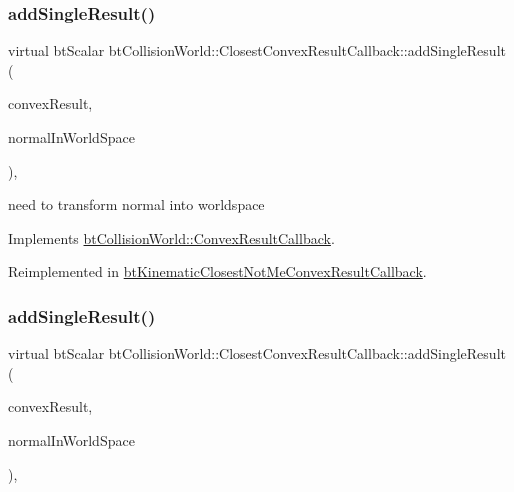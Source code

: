 \subsubsection{\texorpdfstring{add\+Single\+Result()}{addSingleResult()}\hspace{0.1cm}{\footnotesize\ttfamily [1/2]}}
{\footnotesize\ttfamily virtual bt\+Scalar bt\+Collision\+World\+::\+Closest\+Convex\+Result\+Callback\+::add\+Single\+Result (\begin{DoxyParamCaption}\item[{\hyperlink{structbtCollisionWorld_1_1LocalConvexResult}{Local\+Convex\+Result} \&}]{convex\+Result,  }\item[{bool}]{normal\+In\+World\+Space }\end{DoxyParamCaption})\hspace{0.3cm}{\ttfamily [inline]}, {\ttfamily [virtual]}}

need to transform normal into worldspace 

Implements \hyperlink{structbtCollisionWorld_1_1ConvexResultCallback}{bt\+Collision\+World\+::\+Convex\+Result\+Callback}.



Reimplemented in \hyperlink{classbtKinematicClosestNotMeConvexResultCallback_a793706b7811ea2d917349ed1501a77a5}{bt\+Kinematic\+Closest\+Not\+Me\+Convex\+Result\+Callback}.

\mbox{\label{structbtCollisionWorld_1_1ClosestConvexResultCallback_a9dee5c09f1bb54f868f34a28353b4505}} 
\subsubsection{\texorpdfstring{add\+Single\+Result()}{addSingleResult()}\hspace{0.1cm}{\footnotesize\ttfamily [2/2]}}
{\footnotesize\ttfamily virtual bt\+Scalar bt\+Collision\+World\+::\+Closest\+Convex\+Result\+Callback\+::add\+Single\+Result (\begin{DoxyParamCaption}\item[{\hyperlink{structbtCollisionWorld_1_1LocalConvexResult}{Local\+Convex\+Result} \&}]{convex\+Result,  }\item[{bool}]{normal\+In\+World\+Space }\end{DoxyParamCaption})\hspace{0.3cm}{\ttfamily [inline]}, {\ttfamily [virtual]}}

